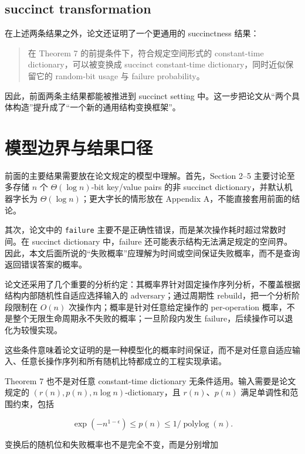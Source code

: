\documentclass[12pt]{article}
\begin{document}
\subsection{succinct transformation}

在上述两条结果之外，论文还证明了一个更通用的 succinctness 结果：

\begin{quote}在 Theorem 7 的前提条件下，符合规定空间形式的 constant-time dictionary，可以被变换成 succinct constant-time dictionary，同时近似保留它的 random-bit usage 与 failure probability。\cite[Theorem~7]{kuszmaul2022}\end{quote}

因此，前面两条主结果都能被推进到 succinct setting 中。这一步把论文从“两个具体构造”提升成了“一个新的通用结构变换框架”。

\section{模型边界与结果口径}

前面的主要结果需要放在论文规定的模型中理解。首先，Section 2--5 主要讨论至多存储 \(n\) 个 \(\Theta(\log n)\)-bit key/value pairs 的非 succinct dictionary，并默认机器字长为 \(\Theta(\log n)\)；更大字长的情形放在 Appendix A，不能直接套用前面的结论\cite[Sec.~2 and Appendix~A]{kuszmaul2022}。

其次，论文中的 \texttt{failure} 主要不是正确性错误，而是某次操作耗时超过常数时间。在 succinct dictionary 中，failure 还可能表示结构无法满足规定的空间界。因此，本文后面所说的“失败概率”应理解为时间或空间保证失败概率，而不是查询返回错误答案的概率\cite[Secs.~2 and 6]{kuszmaul2022}。

论文还采用了几个重要的分析约定：其概率界针对固定操作序列分析，不覆盖根据结构内部随机性自适应选择输入的 adversary；通过周期性 rebuild，把一个分析阶段限制在 \(O(n)\) 次操作内；概率是针对任意给定操作的 per-operation 概率，不是整个无限生命周期永不失败的概率；一旦阶段内发生 failure，后续操作可以退化为较慢实现\cite[Sec.~2]{kuszmaul2022}。

这些条件意味着论文证明的是一种模型化的概率时间保证，而不是对任意自适应输入、任意长操作序列和所有随机比特都成立的工程实现承诺。

Theorem 7 也不是对任意 constant-time dictionary 无条件适用。输入需要是论文规定的 \((r(n),p(n),n\log n)\)-dictionary，且 \(r(n)\)、\(p(n)\) 满足单调性和范围约束，包括

\[
\exp(-n^{1-\epsilon})\le p(n)\le 1/\operatorname{polylog}(n).
\]

变换后的随机位和失败概率也不是完全不变，而是分别增加
\end{document}
